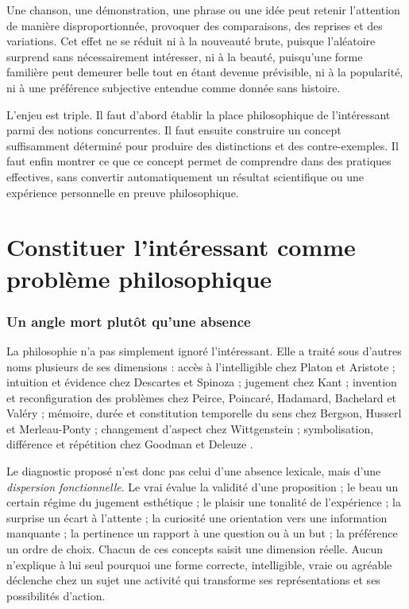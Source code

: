 \documentclass[11pt,a4paper]{article}
\begin{document}
Une chanson, une démonstration, une phrase ou une idée peut retenir l'attention
de manière disproportionnée, provoquer des comparaisons, des reprises et des
variations. Cet effet ne se réduit ni à la nouveauté brute, puisque l'aléatoire
surprend sans nécessairement intéresser, ni à la beauté, puisqu'une forme
familière peut demeurer belle tout en étant devenue prévisible, ni à la
popularité, ni à une préférence subjective entendue comme donnée sans histoire.

L'enjeu est triple. Il faut d'abord établir la place philosophique de
l'intéressant parmi des notions concurrentes. Il faut ensuite construire un
concept suffisamment déterminé pour produire des distinctions et des
contre-exemples. Il faut enfin montrer ce que ce concept permet de comprendre
dans des pratiques effectives, sans convertir automatiquement un résultat
scientifique ou une expérience personnelle en preuve philosophique.

\part{Constituer l'intéressant comme problème philosophique}

\section{Un angle mort plutôt qu'une absence}

La philosophie n'a pas simplement ignoré l'intéressant. Elle a traité sous
d'autres noms plusieurs de ses dimensions : accès à l'intelligible chez Platon
et Aristote
\parencite{platon2016republique,platon1995theetete,aristote1991metaphysique,aristote2005seconds};
intuition et évidence chez Descartes et Spinoza
\parencite{descartes2002regles,descartes1992meditations,spinoza1966ethique};
jugement chez Kant \parencite{kant2001raison,kant1993juger}; invention et
reconfiguration des problèmes chez Peirce, Poincaré, Hadamard, Bachelard et
Valéry
\parencite{peirce1955writings,poincare1908science,hadamard1959invention,bachelard1999formation,valery1973cahiers};
mémoire, durée et constitution temporelle du sens chez Bergson, Husserl et
Merleau-Ponty
\parencite{bergson2013evolution,bergson2013pensee,husserl1970experience,husserl1957logique,merleau1945phenomenologie};
changement d'aspect chez Wittgenstein \parencite{wittgenstein2004recherches};
symbolisation, différence et répétition chez Goodman et Deleuze
\parencite{goodman1976languages,deleuze1968difference}.

Le diagnostic proposé n'est donc pas celui d'une absence lexicale, mais d'une
\emph{dispersion fonctionnelle}. Le vrai évalue la validité d'une proposition ;
le beau un certain régime du jugement esthétique ; le plaisir une tonalité de
l'expérience ; la surprise un écart à l'attente ; la curiosité une orientation
vers une information manquante ; la pertinence un rapport à une question ou à
un but ; la préférence un ordre de choix. Chacun de ces concepts saisit une
dimension réelle. Aucun n'explique à lui seul pourquoi une forme correcte,
intelligible, vraie ou agréable déclenche chez un sujet une activité qui
transforme ses représentations et ses possibilités d'action.
\end{document}
